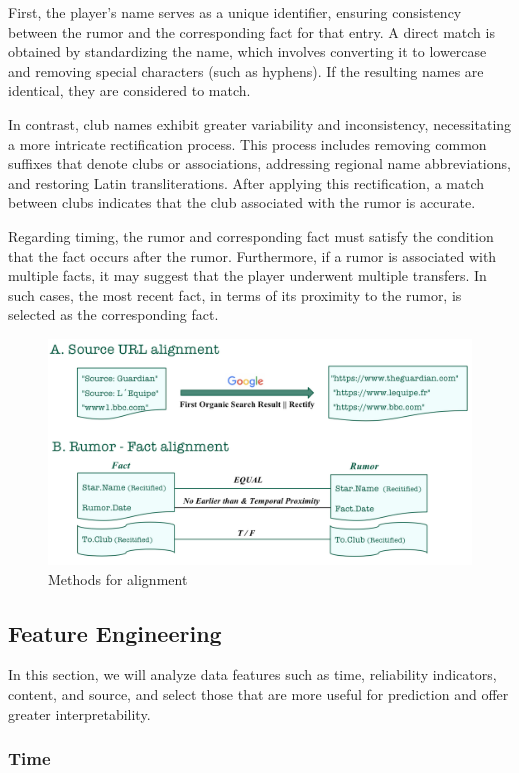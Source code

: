 First, the player’s name serves as a unique identifier, ensuring consistency between the rumor and the corresponding fact for that entry. A direct match is obtained by standardizing the name, which involves converting it to lowercase and removing special characters (such as hyphens). If the resulting names are identical, they are considered to match.

In contrast, club names exhibit greater variability and inconsistency, necessitating a more intricate rectification process. This process includes removing common suffixes that denote clubs or associations, addressing regional name abbreviations, and restoring Latin transliterations. After applying this rectification, a match between clubs indicates that the club associated with the rumor is accurate.

Regarding timing, the rumor and corresponding fact must satisfy the condition that the fact occurs after the rumor. Furthermore, if a rumor is associated with multiple facts, it may suggest that the player underwent multiple transfers. In such cases, the most recent fact, in terms of its proximity to the rumor, is selected as the corresponding fact.


\begin{figure}[ht]
    \centering
    \includegraphics[width=.6\textwidth]{figs/align_metd.png}
    \caption{
        Methods for alignment
    }\label{fig:align_metd}
\end{figure}

\subsection{Feature Engineering}


In this section, we will analyze data features such as time, reliability indicators, content, and source, and select those that are more useful for prediction and offer greater interpretability.

\subsubsection{Time}

